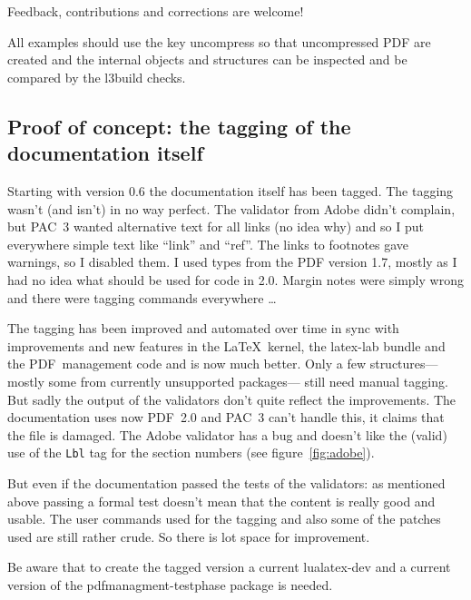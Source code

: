 \documentclass[bibliography=totoc,a4paper]{article}
\newcommand\PrintKeyName[1]{\textsf{#1}}
\newcommand\PDF{PDF}
\begin{document}
\begin{tcolorbox}
Feedback, contributions and corrections are welcome!
\end{tcolorbox}


All examples should use the  key \PrintKeyName{uncompress}
so that uncompressed \PDF{} are created and the internal objects and 
structures can be inspected and be compared by the l3build checks.%



\subsection{Proof of concept: the tagging of the documentation itself}

Starting with version 0.6 the documentation itself has been tagged. The 
tagging wasn't (and isn't) in no way perfect. The validator from Adobe didn't 
complain, but PAC~3 wanted alternative text for all links (no idea why) and 
so I put everywhere simple text like \enquote{link} and \enquote{ref}. The 
links to footnotes gave warnings, so I disabled them. I used types from the 
\PDF{} version 1.7, mostly as I had no idea what should be used for code in 
2.0. Margin notes were simply wrong and there were tagging commands 
everywhere \ldots 

The tagging has been improved and automated over time in sync with 
improvements and new features in the \LaTeX\ kernel, the latex-lab bundle and 
the \PDF\ management code and is now much better. Only a few 
structures---mostly some from currently unsupported packages--- still need 
manual tagging. But sadly the output of the validators don't quite reflect 
the improvements. The documentation uses now \PDF~2.0  and PAC~3 can't handle 
this, it claims that the file is damaged. The Adobe validator has a bug and 
doesn't like the (valid) use of  the \texttt{Lbl} tag for the section numbers 
(see figure~\ref{fig:adobe}).  


But even if the documentation passed the tests of the validators:  as 
mentioned above passing a formal test doesn't mean that the content is really 
good and usable. The user commands used for the tagging and also some of the 
patches used are still rather crude. So there is lot space for improvement. 

\begin{tcolorbox}[before upper=\tagpdfparaOn]
Be aware that to create the tagged version a current lualatex-dev and a 
current version of the pdfmanagment-testphase package is needed. 
\end{tcolorbox}
\end{document}
